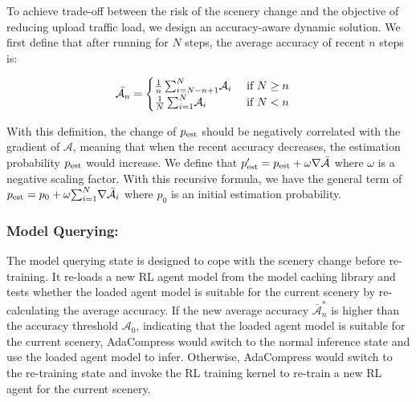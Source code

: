 To achieve trade-off between the risk of the scenery change and the objective of reducing upload traffic load, we design an accuracy-aware dynamic solution. We first define that after running for $ N $ steps, the average accuracy of recent $ n $ steps is: 

\begin{align*}
\bar{\mathcal{A}_n} &=
\begin{cases}
{\color{revise}\frac{1}{n}\sum_{i=N-n+1}^{N} } \mathcal{A}_i & \text{ if } N \geq n \\ 
{\color{revise}\frac{1}{N}\sum_{i=1}^{N} }\mathcal{A}_i & \text{ if } N < n 
\end{cases}
\end{align*}

With this definition, \textcolor{revise}{the change of $ p_{\rm est} $ should be negatively correlated with} the gradient of $ \mathcal{A} $, meaning that when the recent accuracy decreases, the estimation probability $ p_{\rm est} $ would increase. We define that $ p'_{\rm est} = p_{\rm est} + \omega \nabla \bar{\mathcal{A}} $ where $ \omega $ is a \textcolor{revise}{negative} scaling factor. With this recursive formula, we have the general term of $p_{\rm est} = p_0 + \omega {\color{revise}\sum_{i=1}^{N}} \nabla \bar{\mathcal{A}_i} $ where $ p_0 $ is an initial estimation probability.


\subsubsection{Model Querying:}

The model querying state is designed to cope with the scenery change before re-training. It re-loads a new RL agent model from the model caching library and tests whether the loaded agent model is suitable for the current scenery by re-calculating the average accuracy. If the new average accuracy $ \bar{\mathcal{A}}^*_n $ is higher than the accuracy threshold $ \mathcal{A}_0 $, indicating that the loaded agent model is suitable for the current scenery, AdaCompress would switch to the normal inference state and use the loaded agent model to infer. Otherwise, AdaCompress would switch to the re-training state and invoke the RL training kernel to re-train a new RL agent for the current scenery.

